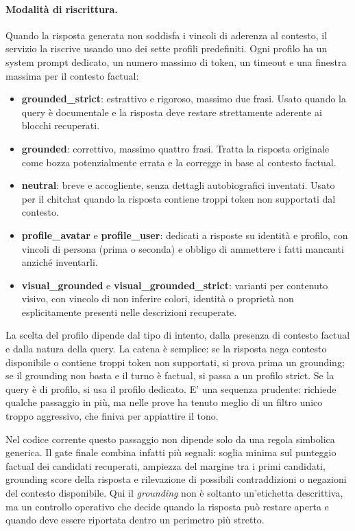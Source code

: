 \paragraph{Modalità di riscrittura.}

Quando la risposta generata non soddisfa i vincoli di aderenza al contesto, il servizio la riscrive usando uno dei sette profili predefiniti. Ogni profilo ha un system prompt dedicato, un numero massimo di token, un timeout e una finestra massima per il contesto factual:
\begin{itemize}
\item \textbf{grounded\_strict}: estrattivo e rigoroso, massimo due frasi. Usato quando la query è documentale e la risposta deve restare strettamente aderente ai blocchi recuperati.
\item \textbf{grounded}: correttivo, massimo quattro frasi. Tratta la risposta originale come bozza potenzialmente errata e la corregge in base al contesto factual.
\item \textbf{neutral}: breve e accogliente, senza dettagli autobiografici inventati. Usato per il chitchat quando la risposta contiene troppi token non supportati dal contesto.
\item \textbf{profile\_avatar} e \textbf{profile\_user}: dedicati a risposte su identità e profilo, con vincoli di persona (prima o seconda) e obbligo di ammettere i fatti mancanti anziché inventarli.
\item \textbf{visual\_grounded} e \textbf{visual\_grounded\_strict}: varianti per contenuto visivo, con vincolo di non inferire colori, identità o proprietà non esplicitamente presenti nelle descrizioni recuperate.
\end{itemize}

La scelta del profilo dipende dal tipo di intento, dalla presenza di contesto factual e dalla natura della query. La catena è semplice: se la risposta nega contesto disponibile o contiene troppi token non supportati, si prova prima un grounding; se il grounding non basta e il turno è factual, si passa a un profilo strict. Se la query è di profilo, si usa il profilo dedicato. E' una sequenza prudente: richiede qualche passaggio in più, ma nelle prove ha tenuto meglio di un filtro unico troppo aggressivo, che finiva per appiattire il tono.

Nel codice corrente questo passaggio non dipende solo da una regola simbolica generica. Il gate finale combina infatti più segnali: soglia minima sul punteggio factual dei candidati recuperati, ampiezza del margine tra i primi candidati, grounding score della risposta e rilevazione di possibili contraddizioni o negazioni del contesto disponibile. Qui il \emph{grounding} non è soltanto un'etichetta descrittiva, ma un controllo operativo che decide quando la risposta può restare aperta e quando deve essere riportata dentro un perimetro più stretto.

